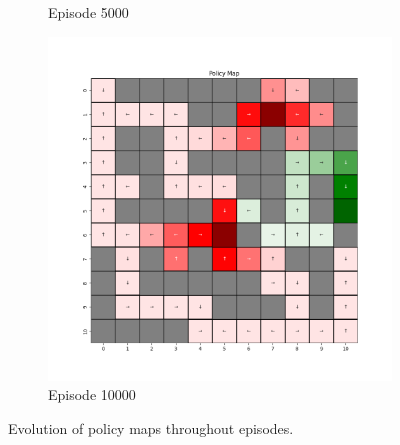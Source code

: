 \documentclass{assignment}
\begin{document}
\begin{figure}[H]
\begin{subfigure}{0.3\textwidth}
    \caption{Episode 5000}
    \end{subfigure}\hfill
    \begin{subfigure}{0.3\textwidth}
        \includegraphics[width=\textwidth]{figures/policy_td/alpha_sweep/policy_alpha_0.5_gamma_0.95_epsilon_0.2_iteration_10000.png}
    \caption{Episode 10000}
    \end{subfigure}
    \caption{Evolution of policy maps throughout episodes.}
    \label{fig:alpha_0.5_td_learning_policy}
\end{figure}
\end{document}
